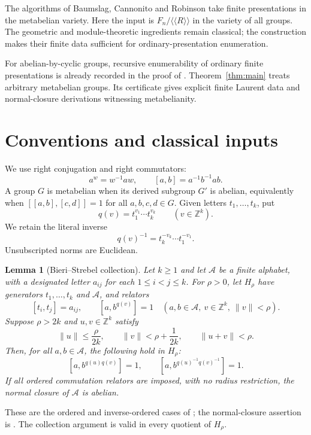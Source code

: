 \documentclass[12pt]{article}
\numberwithin{equation}{section}
\newtheorem{lemma}[theorem]{Lemma}
\theoremstyle{definition}
\theoremstyle{remark}
\newcommand{\Z}{\mathbb Z}
\newcommand{\nc}[1]{\langle\!\langle #1\rangle\!\rangle}
\newcommand{\norm}[1]{\lVert #1\rVert}
\begin{document}
The algorithms of Baumslag, Cannonito and Robinson
\cite[p.~630 and Theorems~2.1, 3.1]{BCR} take finite presentations in
the metabelian variety. Here the input is $F_n/\nc{R}$ in the variety
of all groups. The geometric and module-theoretic ingredients remain
classical; the construction makes their finite data sufficient for
ordinary-presentation enumeration.

For abelian-by-cyclic groups, recursive enumerability of ordinary finite
presentations is already recorded in the proof of
\cite[Lemma~11.4]{GMW}. Theorem~\ref{thm:main} treats arbitrary
metabelian groups. Its certificate gives explicit finite Laurent data
and normal-closure derivations witnessing metabelianity.

\section{Conventions and classical inputs}
\label{sec:classical}

We use right conjugation and right commutators:
\[
 a^w=w^{-1}aw,\qquad [a,b]=a^{-1}b^{-1}ab.
\]
A group $G$ is metabelian when its derived subgroup $G'$ is abelian,
equivalently when $[[a,b],[c,d]]=1$ for all $a,b,c,d\in G$.
Given letters $t_1,\ldots,t_k$, put
\[
 q(v)=t_1^{v_1}\cdots t_k^{v_k}\qquad(v\in\Z^k).
\]
We retain the literal inverse
\[
 q(v)^{-1}=t_k^{-v_k}\cdots t_1^{-v_1}.
\]
Unsubscripted norms are Euclidean.

\begin{lemma}[Bieri--Strebel collection]
\label{lem:collection}
Let $k\ge1$ and let $\mathcal A$ be a finite alphabet, with a designated letter $a_{ij}$
for each $1\le i<j\le k$. For $\rho>0$, let $H_\rho$ have generators
$t_1,\ldots,t_k$ and $\mathcal A$, and relators
\[
 [t_i,t_j]=a_{ij},\qquad
 [a,b^{q(v)}]=1
 \quad(a,b\in\mathcal A,\ v\in\Z^k,\ \norm v<\rho).
\]
Suppose $\rho>2k$ and $u,v\in\Z^k$ satisfy
\begin{equation}
\label{eq:collection}
 \norm u\le \frac{\rho}{2k},\qquad
 \norm v<\rho+\frac1{2k},\qquad
 \norm{u+v}<\rho.
\end{equation}
Then, for all $a,b\in\mathcal A$, the following hold in $H_\rho$:
\[
 [a,b^{q(u)q(v)}]=1,\qquad
 [a,b^{q(u)^{-1}q(v)^{-1}}]=1.
\]
If all ordered commutation relators are imposed, with no radius
restriction, the normal closure of $\mathcal A$ is abelian.
\end{lemma}

These are the ordered and inverse-ordered cases of
\cite[Lemma~3.4b]{BS}; the normal-closure assertion is
\cite[Corollary~3.3]{BS}. The collection argument
\cite[Lemma~3.2]{BS} is valid in every quotient of $H_\rho$.
\end{document}
